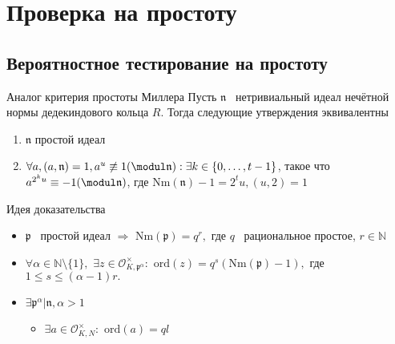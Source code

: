\documentclass[8pt, xcolor=x11names]{beamer}
\begin{document}
\section{Проверка на простоту}

\subsection{Вероятностное тестирование на простоту}

\begin{frame}
    \begin{block}{Аналог критерия простоты Миллера}
        Пусть $\mathfrak{n}$ \textendash\ нетривиальный идеал нечётной нормы дедекиндового кольца $R$.
        Тогда следующие утверждения эквивалентны
        \begin{enumerate}
            \item $\mathfrak{n}$ простой идеал

            \item $\forall a,(a, \mathfrak{n})=1, a^u\not\equiv 1(\modul \mathfrak{n}):\exists k\in\{0,\ldots,t-1\}$, такое что $a^{2^ku}\equiv -1(\modul \mathfrak{n})$, где $\textrm{Nm}(\mathfrak{n})-1=2^tu,(u,2)=1$
        \end{enumerate}    
    \end{block}
    
    \begin{block}{Идея доказательства}
        \begin{itemize}
            \item $\mathfrak{p}$ \textendash\ простой идеал $\Rightarrow$ $\textrm{Nm}(\mathfrak{p})=q^r,$ где $q$ \textendash\ рациональное простое, $r \in \mathbb{N}$
            
            \item $\forall \alpha \in \mathbb{N} \setminus \{1\},$ $\exists z \in \mathcal{O}_{K,\mathfrak{p}^{\alpha}}^\times:$ $\textrm{ord}(z)=q^s(\textrm{Nm}(\mathfrak{p})-1),$ где $1 \le s \le (\alpha-1)r.$
            
            \item $\exists \mathfrak{p}^\alpha|\mathfrak{n}, \alpha > 1$
            \begin{itemize}
                \item $\exists a \in \mathcal{O}_{K, N}^\times:$ $\textrm{ord}(a)=ql$
                

\end{itemize}
\end{itemize}
\end{block}
\end{frame}
\end{document}
